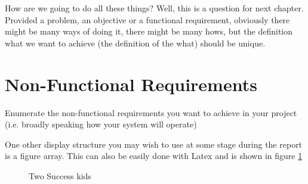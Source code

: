 How are we going to do all these things? Well, this is a question for next chapter. Provided a problem, an objective or a functional requirement, obviously there might be many ways of doing it, there might be many hows, but the definition what we want to achieve (the definition of the what) should be unique.

\section{Non-Functional Requirements}
Enumerate the non-functional requirements you want to achieve in your project (i.e. broadly speaking how your system will operate)

One other display structure you may wish to use at some stage during the report is a figure array. This can also be easily done with Latex and is shown in figure \ref{fig:twosuccesskid}

\begin{figure}
\centering     %
{}
\caption{Two Success kids}
\label{fig:twosuccesskid}
\end{figure}